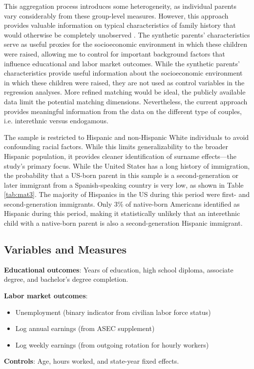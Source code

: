 This aggregation process introduces some heterogeneity, as individual parents vary considerably from these group-level measures. However, this approach provides valuable information on typical characteristics of family history that would otherwise be completely unobserved \autocite{rubinstein2014pride,aaronson2008intergenerational}. The synthetic parents' characteristics serve as useful proxies for the socioeconomic environment in which these children were raised, allowing me to control for important background factors that influence educational and labor market outcomes. While the synthetic parents' characteristics provide useful information about the socioeconomic environment in which these children were raised, they are not used as control variables in the regression analyses. More refined matching would be ideal, the publicly available data limit the potential matching dimensions. Nevertheless, the current approach provides meaningful information from the data on the different type of couples, i.e. interethnic versus endogamous.

The sample is restricted to Hispanic and non-Hispanic White individuals to avoid confounding racial factors. While this limits generalizability to the broader Hispanic population, it provides cleaner identification of surname effects—the study's primary focus. While the United States has a long history of immigration, the probability that a US-born parent in this sample is a second-generation or later immigrant from a Spanish-speaking country is very low, as shown in Table \ref{tab:mat3}. The majority of Hispanics in the US during this period were first- and second-generation immigrants. Only 3\% of native-born Americans identified as Hispanic during this period, making it statistically unlikely that an interethnic child with a native-born parent is also a second-generation Hispanic immigrant.

\subsection{Variables and Measures}

\textbf{Educational outcomes}: Years of education, high school diploma, associate degree, and bachelor's degree completion.

\textbf{Labor market outcomes}:
\begin{itemize}
\item Unemployment (binary indicator from civilian labor force status)
\item Log annual earnings (from ASEC supplement)
\item Log weekly earnings (from outgoing rotation for hourly workers)
\end{itemize}
\textbf{Controls}: Age, hours worked, and state-year fixed effects.

